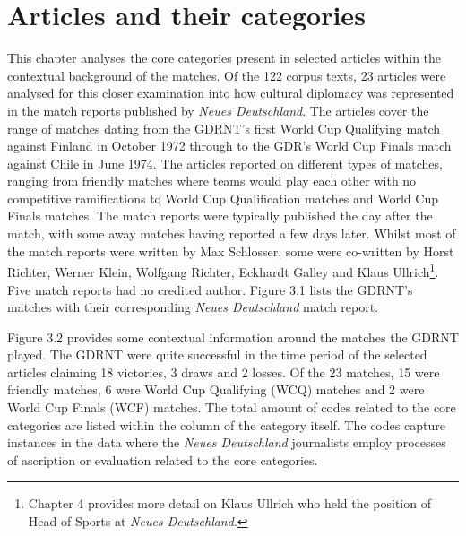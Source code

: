 \chapter{Articles and their categories\label{cha:articles}}

This chapter analyses the core categories present in selected articles within the contextual background of the matches. Of the 122 corpus texts, 23 articles were analysed for this closer examination into how cultural diplomacy was represented in the match reports published by \textit{Neues Deutschland}. The articles cover the range of matches dating from the GDRNT's first World Cup Qualifying match against Finland in October 1972 through to the GDR’s World Cup Finals match against Chile in June 1974. The articles reported on different types of matches, ranging from friendly matches where teams would play each other with no competitive ramifications to World Cup Qualification matches and World Cup Finals matches. The match reports were typically published the day after the match, with some away matches having reported a few days later. Whilst most of the match reports were written by Max Schlosser, some were co-written by Horst Richter, Werner Klein, Wolfgang Richter, Eckhardt Galley and Klaus Ullrich\footnote{Chapter 4 provides more detail on Klaus Ullrich who held the position of Head of Sports at \textit{Neues Deutschland}.}. Five match reports had no credited author. Figure 3.1 lists the GDRNT’s matches with their corresponding \textit{Neues Deutschland} match report.

Figure 3.2 provides some contextual information around the matches the GDRNT played. The GDRNT were quite successful in the time period of the selected articles claiming 18 victories, 3 draws and 2 losses. Of the 23 matches, 15 were friendly matches, 6 were World Cup Qualifying (WCQ) matches and 2 were World Cup Finals (WCF) matches. The total amount of codes related to the core categories are listed within the column of the category itself. The codes capture instances in the data where the \textit{Neues Deutschland} journalists employ processes of ascription or evaluation related to the core categories.

